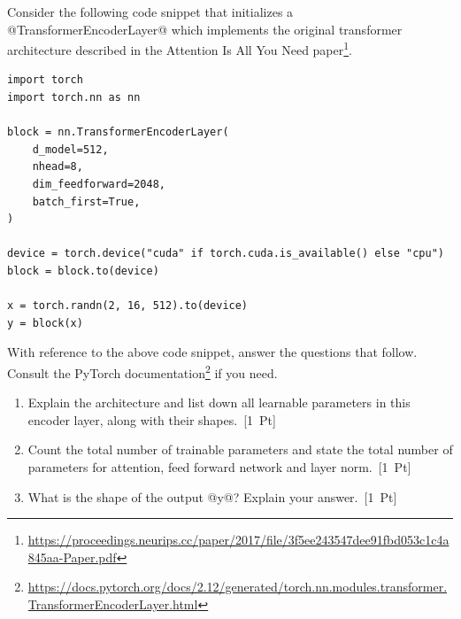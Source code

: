 



Consider the following code snippet that initializes a @TransformerEncoderLayer@ which implements the original transformer architecture described in the Attention Is All You Need paper\footnote{\url{https://proceedings.neurips.cc/paper/2017/file/3f5ee243547dee91fbd053c1c4a845aa-Paper.pdf}}.

\begin{verbatim}
import torch
import torch.nn as nn

block = nn.TransformerEncoderLayer(
    d_model=512,
    nhead=8,
    dim_feedforward=2048,
    batch_first=True,
)

device = torch.device("cuda" if torch.cuda.is_available() else "cpu")
block = block.to(device)

x = torch.randn(2, 16, 512).to(device)
y = block(x)
\end{verbatim}

With reference to the above code snippet, answer the questions that follow. Consult the PyTorch documentation\footnote{\url{https://docs.pytorch.org/docs/2.12/generated/torch.nn.modules.transformer.TransformerEncoderLayer.html}} if you need. 

\begin{enumerate}
    \item Explain the architecture and list down all learnable parameters in this encoder layer, along with their shapes.~[1~Pt]
    \item Count the total number of trainable parameters and state the total number of parameters for attention, feed forward network and layer norm.~[1~Pt]
    \item What is the shape of the output @y@? Explain your answer.~[1~Pt]
\end{enumerate}

